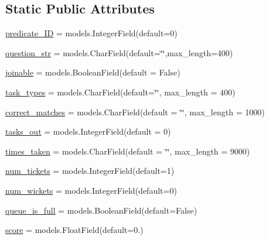 \subsection*{Static Public Attributes}
\begin{DoxyCompactItemize}
\item 
\hyperlink{classdynamicfilterapp_1_1models_1_1_predicate_a283dd268e033ffc2def84793b57df07f}{predicate\+\_\+\+ID} = models.\+Integer\+Field(default=0)
\item 
\hyperlink{classdynamicfilterapp_1_1models_1_1_predicate_a5b127c486dedc27a240e91e6007e5b67}{question\+\_\+str} = models.\+Char\+Field(default=\char`\"{}\char`\"{},max\+\_\+length=400)
\item 
\hyperlink{classdynamicfilterapp_1_1models_1_1_predicate_a8f7c0a6c64622e38ed181ec1519669f1}{joinable} = models.\+Boolean\+Field(default = False)
\item 
\hyperlink{classdynamicfilterapp_1_1models_1_1_predicate_a24192fa356f5262f109cd5e03aabcb63}{task\+\_\+types} = models.\+Char\+Field(default=\char`\"{}\char`\"{}, max\+\_\+length = 400)
\item 
\hyperlink{classdynamicfilterapp_1_1models_1_1_predicate_afa7f671131faeb023ff23ff8593cc029}{correct\+\_\+matches} = models.\+Char\+Field(default = \char`\"{}\char`\"{}, max\+\_\+length = 1000)
\item 
\hyperlink{classdynamicfilterapp_1_1models_1_1_predicate_a3f60ead9e071700c26f1b3316e21cfab}{tasks\+\_\+out} = models.\+Integer\+Field(default = 0)
\item 
\hyperlink{classdynamicfilterapp_1_1models_1_1_predicate_ae9c49aab3c3e87c9686a0d941205d129}{times\+\_\+taken} = models.\+Char\+Field(default = \char`\"{}\char`\"{}, max\+\_\+length = 9000)
\item 
\hyperlink{classdynamicfilterapp_1_1models_1_1_predicate_a591cb1f50f5ceab96242c91732b52479}{num\+\_\+tickets} = models.\+Integer\+Field(default=1)
\item 
\hyperlink{classdynamicfilterapp_1_1models_1_1_predicate_a318c32bc04e208718aafdebe2c988f2a}{num\+\_\+wickets} = models.\+Integer\+Field(default=0)
\item 
\hyperlink{classdynamicfilterapp_1_1models_1_1_predicate_a65d900ce290e9cb7df3008e0ed2c2fb7}{queue\+\_\+is\+\_\+full} = models.\+Boolean\+Field(default=False)
\item 
\hyperlink{classdynamicfilterapp_1_1models_1_1_predicate_a9fa1482cd696e2f0c104e04a9d46a29d}{score} = models.\+Float\+Field(default=0.)
\item 

\end{DoxyCompactItemize}
